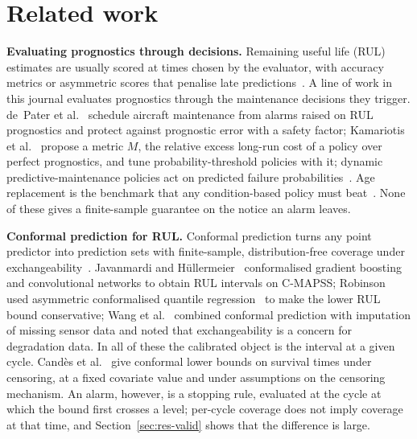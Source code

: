 \section{Related work}\label{sec:related}

\textbf{Evaluating prognostics through decisions.} Remaining useful life (RUL) estimates are usually scored at times chosen by the evaluator, with accuracy metrics or asymmetric scores that penalise late predictions~\cite{saxena2008,saxena2010,ramasso2014}. A line of work in this journal evaluates prognostics through the maintenance decisions they trigger. de~Pater et al.~\cite{depater2022} schedule aircraft maintenance from alarms raised on RUL prognostics and protect against prognostic error with a safety factor; Kamariotis et al.~\cite{kamariotis2024} propose a metric $M$, the relative excess long-run cost of a policy over perfect prognostics, and tune probability-threshold policies with it; dynamic predictive-maintenance policies act on predicted failure probabilities~\cite{nguyen2019,mitici2023}. Age replacement is the benchmark that any condition-based policy must beat~\cite{barlow1960,dejonge2020}. None of these gives a finite-sample guarantee on the notice an alarm leaves.

\textbf{Conformal prediction for RUL.} Conformal prediction turns any point predictor into prediction sets with finite-sample, distribution-free coverage under exchangeability~\cite{vovk2005,lei2018,angelopoulos2023}. Javanmardi and H\"ullermeier~\cite{javanmardi2023} conformalised gradient boosting and convolutional networks to obtain RUL intervals on C-MAPSS; Robinson~\cite{robinson2026} used asymmetric conformalised quantile regression~\cite{romano2019} to make the lower RUL bound conservative; Wang et al.~\cite{wang2025robustuq} combined conformal prediction with imputation of missing sensor data and noted that exchangeability is a concern for degradation data. In all of these the calibrated object is the interval at a given cycle. Cand\`es et al.~\cite{candes2023} give conformal lower bounds on survival times under censoring, at a fixed covariate value and under assumptions on the censoring mechanism. An alarm, however, is a stopping rule, evaluated at the cycle at which the bound first crosses a level; per-cycle coverage does not imply coverage at that time, and Section~\ref{sec:res-valid} shows that the difference is large.

